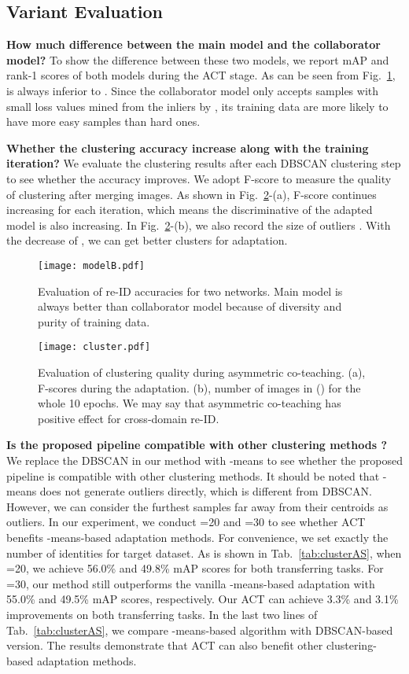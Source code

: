 \documentclass[letterpaper]{article} \usepackage{aaai20}  \usepackage{times}  \usepackage{helvet} \usepackage{courier}  \usepackage[hyphens]{url}  \usepackage{graphicx} \urlstyle{rm} \def\UrlFont{\rm}  \usepackage{graphicx}  \frenchspacing  \setlength{\pdfpagewidth}{8.5in}  \setlength{\pdfpageheight}{11in}  \usepackage{color}
\begin{document}
\subsection{Variant Evaluation}


\textbf{How much difference between the main model and the collaborator model?}
To show the difference between these two models, we report mAP and rank-1 scores of both models during the ACT stage. As can be seen from Fig.~\ref{fig:modelB},  is always inferior to . Since the collaborator model only accepts samples with small loss values mined from the inliers  by , its training data are more likely to have more easy samples than hard ones.


\textbf{Whether the clustering accuracy increase along with the training iteration?}
We evaluate the clustering results after each DBSCAN clustering step to see whether the accuracy improves. We adopt F-score to measure the quality of clustering after merging  images. As shown in Fig.~\ref{fig:cluster}-(a), F-score continues increasing for each iteration, which means the discriminative of the adapted model is also increasing. In Fig.~\ref{fig:cluster}-(b), we also record the size of outliers . With the decrease of , we can get better clusters for adaptation.


\begin{figure}[!t]
  \centering
  \texttt{[image: modelB.pdf]}
  \caption{Evaluation of re-ID accuracies for two networks. Main model is always better than collaborator model because of diversity and purity of training data.}
  \label{fig:modelB}
\end{figure}
\begin{figure}[!t]
  \centering
  \texttt{[image: cluster.pdf]}
  \caption{Evaluation of clustering quality during asymmetric co-teaching. (a), F-scores during the adaptation. (b), number of images in  () for the whole 10 epochs. We may say that asymmetric co-teaching has positive effect for cross-domain re-ID.}
  \label{fig:cluster}
\end{figure}

\textbf{Is the proposed pipeline compatible with other clustering methods ?}
We replace the DBSCAN in our method with -means to see whether the proposed pipeline is compatible with other clustering methods. It should be noted that -means does not generate outliers directly, which is different from DBSCAN. However, we can consider the furthest  samples far away from their centroids as outliers. In our experiment, we conduct =20 and =30 to see whether ACT benefits -means-based adaptation methods. For convenience, we set  exactly the number of identities for target dataset. As is shown in Tab.~\ref{tab:clusterAS}, when =20, we achieve 56.0\% and 49.8\% mAP scores for both transferring tasks. For =30, our method still outperforms the vanilla -means-based adaptation with 55.0\% and 49.5\% mAP scores, respectively. Our ACT can achieve 3.3\% and 3.1\% improvements on both transferring tasks. In the last two lines of Tab.~\ref{tab:clusterAS}, we compare -means-based algorithm with DBSCAN-based version. The results demonstrate that ACT can also benefit other clustering-based adaptation methods.
\end{document}

